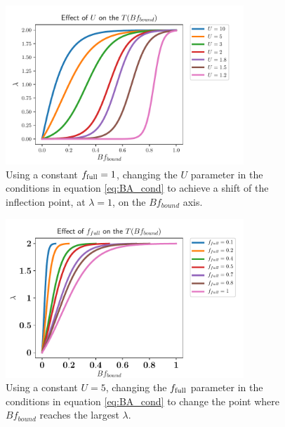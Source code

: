 \begin{figure}
    \centering
    \includegraphics[width=0.8\textwidth]{figures/T_Bfbound_U.pdf}
    \caption{
        \label{fig:T_Bfbound_U}
        Using a constant $f_{\text{full}} = 1$, changing the $U$ parameter in the conditions in equation \ref{eq:BA_cond} to achieve a shift of the inflection point, at $\lambda=1$, on the $Bf_{bound}$ axis.
    }
\end{figure}

\begin{figure}
    \centering
    \includegraphics[width=0.8\textwidth]{figures/T_Bfbound_f_full.pdf}
    \caption{
        \label{fig:T_Bfbound_f_full}
        Using a constant $U = 5$, changing the $f_{\text{full}}$ parameter in the conditions in equation \ref{eq:BA_cond} to change the point where $Bf_{bound}$ reaches the largest $\lambda$.
    }
\end{figure}








